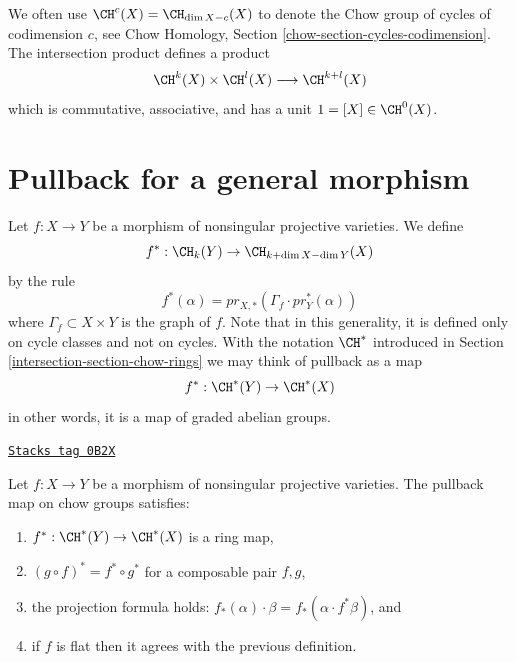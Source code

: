 \medskip\noindent
We often use $\CH^c(X) = \CH_{\dim X - c}(X)$ to denote the Chow group of
cycles of codimension $c$, see
Chow Homology, Section \ref{chow-section-cycles-codimension}.
The intersection product defines a product
$$
\CH^k(X) \times \CH^l(X) \longrightarrow \CH^{k + l}(X)
$$
which is commutative, associative, and has a unit $1 = [X] \in \CH^0(X)$.

\section{Pullback for a general morphism}
\label{intersection-section-general-pullback}
Let $f : X \to Y$ be a morphism of nonsingular projective varieties.
We define
$$
f^* : \CH_k(Y) \to \CH_{k+\dim X - \dim Y}(X)
$$
by the rule
$$
f^*(\alpha) = pr_{X, *}(\Gamma_f \cdot pr_Y^*(\alpha))
$$
where $\Gamma_f \subset X\times Y$ is the graph of $f$. Note that in this
generality, it is defined only on cycle classes and not on cycles. With the
notation $\CH^*$ introduced in Section \ref{intersection-section-chow-rings}
we may think of pullback as a map
$$
f^* : \CH^*(Y) \to \CH^*(X)
$$
in other words, it is a map of graded abelian groups.

\begin{lemma}
\label{intersection-lemma-pullback-and-intersection-product}
\href{https://stacks.math.columbia.edu/tag/0B2X}{\texttt{Stacks tag 0B2X}}

Let $f : X \to Y$ be a morphism of nonsingular projective varieties.
The pullback map on chow groups satisfies:
\begin{enumerate}
\item $f^* : \CH^*(Y) \to \CH^*(X)$ is a ring map,
\item $(g \circ f)^* = f^* \circ g^*$ for a composable pair $f, g$,
\item the projection formula holds: $f_*(\alpha) \cdot \beta =
f_*( \alpha \cdot f^*\beta)$, and
\item if $f$ is flat then it agrees with the previous definition.
\end{enumerate}
\end{lemma}

